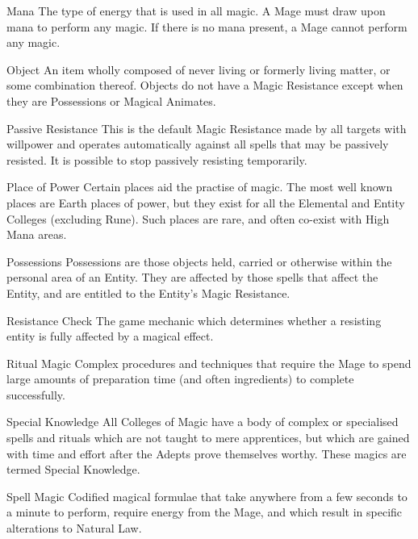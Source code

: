 \begin{multicols*}{3}
\begin{Description}
\item[Mana] The type of energy that is used in all magic. A Mage must
draw upon mana to perform any magic. If there is no mana present, a
Mage cannot perform any magic.

\item[Object] An item wholly composed of never living or formerly
living matter, or some combination thereof.  Objects do not have a
Magic Resistance except when they are Possessions or Magical Animates.

\item[Passive Resistance] This is the default Magic Resistance made by
all targets with willpower and operates automatically against all
spells that may be passively resisted. It is possible to stop
passively resisting temporarily.

\item[Place of Power] Certain places aid the practise of magic. The
most well known places are Earth places of power, but they exist for
all the Elemental and Entity Colleges (excluding Rune). Such places
are rare, and often co-exist with High Mana areas.

\item[Possessions] Possessions are those objects held, carried or
otherwise within the personal area of an Entity.  They are affected by
those spells that affect the Entity, and are entitled to the Entity's
Magic Resistance.

\item[Resistance Check] The game mechanic which determines whether a
resisting entity is fully affected by a magical effect.

\item[Ritual Magic] Complex procedures and techniques that require the
Mage to spend large amounts of preparation time (and often
ingredients) to complete successfully.

\item[Special Knowledge] All Colleges of Magic have a body of complex
or specialised spells and rituals which are not taught to mere
apprentices, but which are gained with time and effort after the
Adepts prove themselves worthy. These magics are termed Special
Knowledge.

\item[Spell Magic] Codified magical formulae that take anywhere from a
few seconds to a minute to perform, require energy from the Mage, and
which result in specific alterations to Natural Law.


\end{Description}
\end{multicols*}
